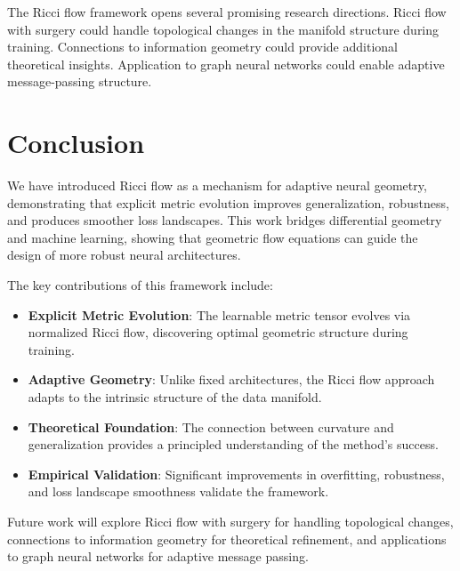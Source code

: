 \documentclass[12pt,a4paper]{article}
\begin{document}
The Ricci flow framework opens several promising research directions. Ricci flow with surgery could handle topological changes in the manifold structure during training. Connections to information geometry could provide additional theoretical insights. Application to graph neural networks could enable adaptive message-passing structure.

\section{Conclusion}

We have introduced Ricci flow as a mechanism for adaptive neural geometry, demonstrating that explicit metric evolution improves generalization, robustness, and produces smoother loss landscapes. This work bridges differential geometry and machine learning, showing that geometric flow equations can guide the design of more robust neural architectures.

The key contributions of this framework include:

\begin{itemize}[leftmargin=1cm]
\item \textbf{Explicit Metric Evolution}: The learnable metric tensor evolves via normalized Ricci flow, discovering optimal geometric structure during training.

\item \textbf{Adaptive Geometry}: Unlike fixed architectures, the Ricci flow approach adapts to the intrinsic structure of the data manifold.

\item \textbf{Theoretical Foundation}: The connection between curvature and generalization provides a principled understanding of the method's success.

\item \textbf{Empirical Validation}: Significant improvements in overfitting, robustness, and loss landscape smoothness validate the framework.
\end{itemize}

Future work will explore Ricci flow with surgery for handling topological changes, connections to information geometry for theoretical refinement, and applications to graph neural networks for adaptive message passing.

\vfill
\end{document}
